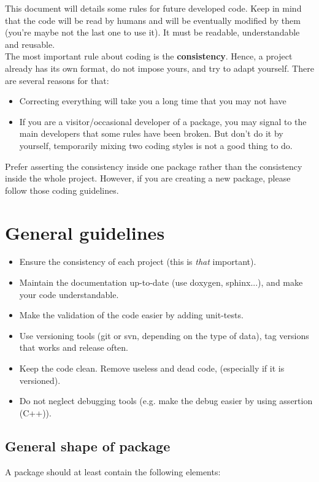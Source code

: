 This document will details some rules for future developed code.
Keep in mind that the code will be read by humans and will be eventually modified by them (you're maybe not the last one to use it). 
It must be readable, understandable and reusable.\\

The most important rule about coding is the \textbf{consistency}.
Hence, a project already has its own format, do not impose yours, and try to adapt yourself.
There are several reasons for that:
\begin{itemize}
\item Correcting everything will take you a long time that you may not have
\item If you are a visitor/occasional developer of a package, you may signal to the main developers that some rules have been broken. But don't do it by yourself, temporarily mixing two coding styles is not a good thing to do.
\end{itemize}
Prefer asserting the consistency inside one package rather than the consistency inside the whole project.
However, if you are creating a new package, please follow those coding guidelines.

\section{General guidelines}
\begin{itemize}
\item Ensure the consistency of each project (this is \textit{that} important).
\item Maintain the documentation up-to-date (use doxygen, sphinx...), and make your code understandable.
\item Make the validation of the code easier by adding unit-tests.
\item Use versioning tools (git or svn, depending on the type of data), tag versions that works and release often.
\item Keep the code clean. Remove useless and dead code, (especially if it is versioned).
\item Do not neglect debugging tools (e.g. make the debug easier by using assertion (C++)).
\end{itemize}

\subsection{General shape of package}
A package should at least contain the following elements:
